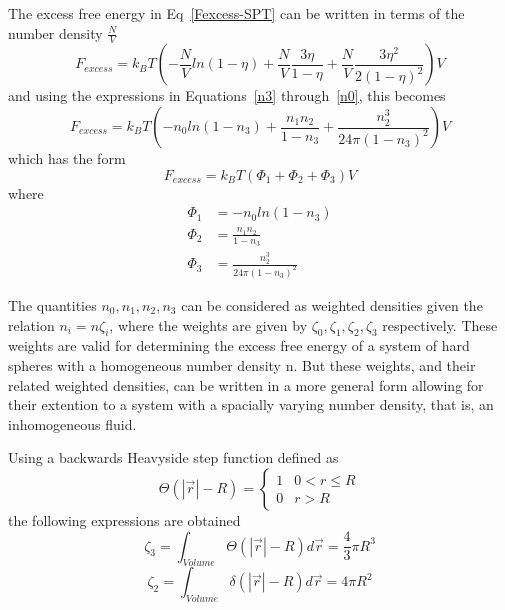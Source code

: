 \documentclass[double,12pt]{beavtex}
\begin{document}
\noindent The excess free energy in Eq~\ref{Fexcess-SPT} can be written in terms of the number density $\frac{N}{V}$
\begin{equation}{F_{excess}=k_{B}T\left(-\frac{N}{V}ln(1-\eta)+\frac{N}{V}\frac{3\eta}{1-\eta}+\frac{N}{V}\frac{3{\eta}^2}{2(1-\eta)^2}\right)V}\end{equation}
and using the expressions in Equations~\ref{n3} through~\ref{n0}, this becomes
\begin{equation}\label{FexfromSPT}{F_{excess}=k_{B}T\left(-n_{0}ln(1-n_{3})+\frac{n_{1}n_{2}}{1-n_{3}}+\frac{n_{2}^3}{24\pi(1-n_{3})^2}\right)V}\end{equation}
which has the form 
\begin{equation}{F_{excess} = k_BT(\Phi_1+\Phi_2+\Phi_3)V}\end{equation}
where 
\begin{align}
   \Phi_1 &= -n_{0}ln(1-n_{3}) \\
   \Phi_2 &= \frac{n_{1}n_{2}}{1-n_{3}} \\
   \Phi_3 &= \frac{n_{2}^3}{24\pi(1-n_{3})^2} 
\end{align}

The quantities $n_{0},n_{1},n_{2},n_{3}$ can be considered as weighted densities given the relation $n_{i}=n\zeta_{i}$, where the weights are given by $\zeta_{0},\zeta_{1},\zeta_{2},\zeta_{3}$ respectively. These weights are valid for determining the excess free energy of a system of hard spheres with a homogeneous number density n. But these weights, and their related  weighted densities, can be written in a more general form allowing for their extention to a system with a spacially varying number density, that is, an inhomogeneous fluid. 

Using a backwards Heavyside step function defined as
\begin{displaymath}{\Theta(|\vec{r}|-R)=\left\{ \begin{array}{rc} 1 & 0<r \leq R \\ 0  & r>R \end{array}\right.}\end{displaymath}
the following expressions are obtained
\begin{equation}{\zeta_{3}=\int_{Volume}{\Theta(|\vec{r}|-R)d{\vec{r}}} = \frac{4}{3}\pi{R^3}}\end{equation}
\begin{equation}{\zeta_{2}=\int_{Volume}{\delta(|\vec{r}|-R)d{\vec{r}}} = 4\pi{R^2}}\end{equation}
\end{document}
